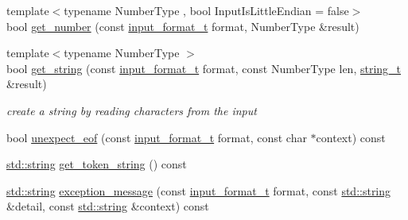 \begin{DoxyCompactItemize}
\item 
{\footnotesize template$<$typename Number\+Type , bool Input\+Is\+Little\+Endian = false$>$ }\\bool \hyperlink{classnlohmann_1_1detail_1_1binary__reader_a161cda5919ea2436b7999c2a76656aba}{get\+\_\+number} (const \hyperlink{namespacenlohmann_1_1detail_aa554fc6a11519e4f347deb25a9f0db40}{input\+\_\+format\+\_\+t} format, Number\+Type \&result)
\item 
{\footnotesize template$<$typename Number\+Type $>$ }\\bool \hyperlink{classnlohmann_1_1detail_1_1binary__reader_a1f4b5da029a561c8711426b0a7316ec6}{get\+\_\+string} (const \hyperlink{namespacenlohmann_1_1detail_aa554fc6a11519e4f347deb25a9f0db40}{input\+\_\+format\+\_\+t} format, const Number\+Type len, \hyperlink{classnlohmann_1_1detail_1_1binary__reader_aa0b9729917ca7ee6ed01e3792341316e}{string\+\_\+t} \&result)
\begin{DoxyCompactList}\small\item\em create a string by reading characters from the input \end{DoxyCompactList}\item 
bool \hyperlink{classnlohmann_1_1detail_1_1binary__reader_a081a76e46862e6d4881b72684d83d084}{unexpect\+\_\+eof} (const \hyperlink{namespacenlohmann_1_1detail_aa554fc6a11519e4f347deb25a9f0db40}{input\+\_\+format\+\_\+t} format, const char $\ast$context) const 
\item 
\hyperlink{namespacenlohmann_1_1detail_a1ed8fc6239da25abcaf681d30ace4985ab45cffe084dd3d20d928bee85e7b0f21}{std\+::string} \hyperlink{classnlohmann_1_1detail_1_1binary__reader_a402e08f5671dd057b1b5dfa001ca3b8f}{get\+\_\+token\+\_\+string} () const 
\item 
\hyperlink{namespacenlohmann_1_1detail_a1ed8fc6239da25abcaf681d30ace4985ab45cffe084dd3d20d928bee85e7b0f21}{std\+::string} \hyperlink{classnlohmann_1_1detail_1_1binary__reader_aa795f9f5f0d89f23b7756434259bae18}{exception\+\_\+message} (const \hyperlink{namespacenlohmann_1_1detail_aa554fc6a11519e4f347deb25a9f0db40}{input\+\_\+format\+\_\+t} format, const \hyperlink{namespacenlohmann_1_1detail_a1ed8fc6239da25abcaf681d30ace4985ab45cffe084dd3d20d928bee85e7b0f21}{std\+::string} \&detail, const \hyperlink{namespacenlohmann_1_1detail_a1ed8fc6239da25abcaf681d30ace4985ab45cffe084dd3d20d928bee85e7b0f21}{std\+::string} \&context) const 
\end{DoxyCompactItemize}
